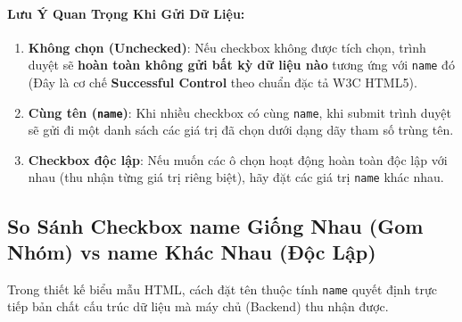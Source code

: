 \documentclass[11pt,oneside]{book}
\newcommand{\codeinline}[1]{\textcolor{accentOrange}{\texttt{#1}}}
\newcommand{\term}[1]{\textbf{\textcolor{primaryBlue}{#1}}}
\begin{document}
\paragraph{Lưu Ý Quan Trọng Khi Gửi Dữ Liệu:}
\begin{enumerate}[leftmargin=1.5em, itemsep=2pt, parsep=0pt]
    \item \textbf{Không chọn (Unchecked)}: Nếu checkbox không được tích chọn, trình duyệt sẽ \textbf{hoàn toàn không gửi bất kỳ dữ liệu nào} tương ứng với \codeinline{name} đó (Đây là cơ chế \term{Successful Control} theo chuẩn đặc tả W3C HTML5).
    \item \textbf{Cùng tên (\codeinline{name})}: Khi nhiều checkbox có cùng \codeinline{name}, khi submit trình duyệt sẽ gửi đi một danh sách các giá trị đã chọn dưới dạng dãy tham số trùng tên.
    \item \textbf{Checkbox độc lập}: Nếu muốn các ô chọn hoạt động hoàn toàn độc lập với nhau (thu nhận từng giá trị riêng biệt), hãy đặt các giá trị \codeinline{name} khác nhau.
\end{enumerate}

\subsection{So Sánh Checkbox name Giống Nhau (Gom Nhóm) vs name Khác Nhau (Độc Lập)}

Trong thiết kế biểu mẫu HTML, cách đặt tên thuộc tính \codeinline{name} quyết định trực tiếp bản chất cấu trúc dữ liệu mà máy chủ (Backend) thu nhận được.
\end{document}
